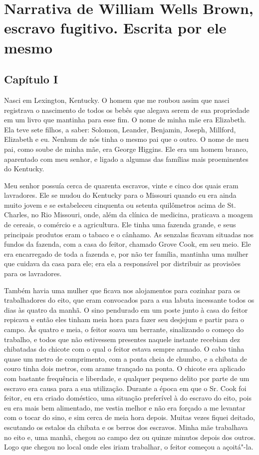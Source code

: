 \movetooddpage
{}
\part*{Narrativa de William Wells Brown, escravo fugitivo. Escrita por ele mesmo}


\chapter{Capítulo I}

Nasci em Lexington, Kentucky. O homem que me roubou assim que nasci
registrava o nascimento de todos os bebês que alegava serem de sua
propriedade em um livro que mantinha para esse fim. O nome de minha mãe
era Elizabeth. Ela teve sete filhos, a saber: Solomon, Leander,
Benjamin, Joseph, Millford, Elizabeth e eu. Nenhum de nós tinha o mesmo
pai que o outro. O nome de meu pai, como soube de minha mãe, era George
Higgins. Ele era um homem branco, aparentado com meu senhor, e ligado a
algumas das famílias mais proeminentes do Kentucky.

Meu senhor possuía cerca de quarenta escravos, vinte e cinco dos quais
eram lavradores. Ele se mudou do Kentucky para o Missouri quando eu era
ainda muito jovem e se estabeleceu cinquenta ou setenta quilômetros
acima de St. Charles, no Rio Missouri, onde, além da clínica de
medicina, praticava a moagem de cereais, o comércio e a agricultura. Ele
tinha uma fazenda grande, e seus principais produtos eram o tabaco e o
cânhamo. As senzalas ficavam situadas nos fundos da fazenda, com a casa
do feitor, chamado Grove Cook, em seu meio. Ele era encarregado de toda
a fazenda e, por não ter família, mantinha uma mulher que cuidava da
casa para ele; era ela a responsável por distribuir as provisões para os
lavradores.

Também havia uma mulher que ficava nos alojamentos para cozinhar para os
trabalhadores do eito, que eram convocados para a sua labuta incessante
todos os dias às quatro da manhã. O sino pendurado em um poste junto à
casa do feitor repicava e então eles tinham meia hora para fazer seu
desjejum e partir para o campo. Às quatro e meia, o feitor soava um
berrante, sinalizando o começo do trabalho, e todos que não estivessem
presentes naquele instante recebiam dez chibatadas do chicote com o qual
o feitor estava sempre armado. O cabo tinha quase um metro de
comprimento, com a ponta cheia de chumbo, e a chibata de couro tinha
dois metros, com arame trançado na ponta. O chicote era aplicado com
bastante frequência e liberdade, e qualquer pequeno delito por parte de
um escravo era causa para a sua utilização. Durante a época em que o Sr.
Cook foi feitor, eu era criado doméstico, uma situação preferível à do
escravo do eito, pois eu era mais bem alimentado, me vestia melhor e não
era forçado a me levantar com o tocar do sino, e sim cerca de meia hora
depois. Muitas vezes fiquei deitado, escutando os estalos da chibata e
os berros dos escravos. Minha mãe trabalhava no eito e, uma manhã,
chegou ao campo dez ou quinze minutos depois dos outros. Logo que chegou
no local onde eles iriam trabalhar, o feitor começou a açoitá"-la.

